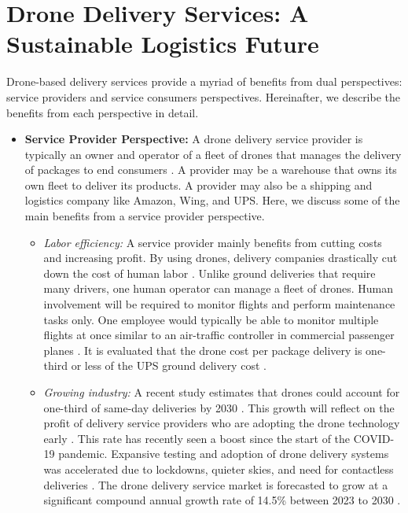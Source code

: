 \documentclass[conference]{IEEEtran}
\begin{document}

\section{Drone Delivery Services: A Sustainable Logistics Future}
Drone-based delivery services provide a myriad of benefits from dual perspectives: service providers and service consumers perspectives. Hereinafter, we describe the benefits from each perspective in detail.
\begin{itemize}[leftmargin=*]
    \item \textbf{Service Provider Perspective:} A drone delivery service provider is typically an owner and operator of a fleet of drones that manages the delivery of packages to end consumers \cite{alkouz2021provider}. A provider may be a warehouse that owns its own fleet to deliver its products. A provider may also be a shipping and logistics company like Amazon, Wing, and UPS. Here, we discuss some of the main benefits from a service provider perspective.
    \begin{itemize}
    \item \textit{Labor efficiency:} A service provider mainly benefits from cutting costs and increasing profit. By using drones, delivery companies drastically cut down the cost of human labor \cite{aurambout2019last}. Unlike ground deliveries that require many drivers, one human operator can manage a fleet of drones. Human involvement will be required to monitor flights and perform maintenance tasks only. One employee would typically be able to monitor multiple flights at once similar to an air-traffic controller in commercial passenger planes \cite{sudbury2016cost}. It is evaluated that the drone cost per package delivery is one-third or less of the UPS ground delivery cost \cite{sudbury2016cost}.
        
    \item \textit{Growing industry:} A recent study estimates that drones could account for one-third of same-day deliveries by 2030 \cite{market}. This growth will reflect on the profit of delivery service providers who are adopting the drone technology early \cite{alkouz2021provider}. This rate has recently seen a boost since the start of the COVID-19 pandemic. Expansive testing and adoption of drone delivery systems was accelerated due to lockdowns, quieter skies, and need for contactless deliveries \cite{shahzaad2021robust}. The drone delivery service market is forecasted to grow at a significant compound annual growth rate of 14.5\% between 2023 to 2030 \cite{market}.


\end{itemize}
\end{itemize}
\end{document}
